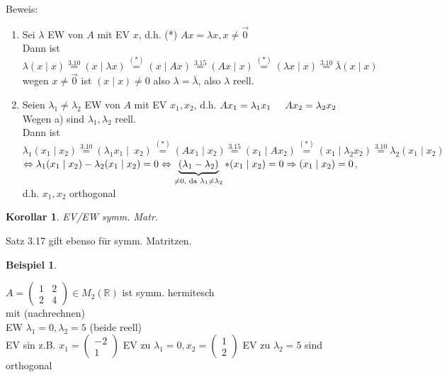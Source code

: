 \documentclass[a4paper,11pt]{article}
\newtheorem{bsp}[definition]{Beispiel}
\newtheorem{koro}[definition]{Korollar}
\newcommand{\zerovec}{\overset{\rightarrow}{0}}
\newcommand{\hsp}{\hspace{5mm}}
\begin{document}
Beweis:
\begin{enumerate}[label=\alph*)]
	\item Sei $\lambda$ EW von $A$ mit EV $x$, d.h. \hsp (*) $Ax=\lambda x, x\neq\zerovec$ \\
	Dann ist $\lambda(x\mid x)\overset{3.10}{=}(x\mid\lambda x)\overset{(*)}{=}(x\mid Ax)\overset{3.15}{=}(Ax\mid x)\overset{(*)}{=}(\lambda x\mid x)\overset{3.10}{=}\bar\lambda(x\mid x)$ \\
	wegen $x\neq\zerovec$ ist $(x\mid x)\neq0$ also $\lambda=\bar\lambda$, also $\lambda$ reell.
	\item Seien $\lambda_1\neq\lambda_2$ EW von $A$ mit EV $x_1,x_2$, d.h. $Ax_1=\lambda_1 x_1\hsp Ax_2=\lambda_2 x_2$ \\
	Wegen a) sind $\lambda_1,\lambda_2$ reell. \\
	Dann ist $\lambda_1(x_1\mid x_2)\overset{3.10}{=}(\lambda_1x_1\mid\ x_2)\overset{(*)}{=}(Ax_1\mid x_2)\overset{3.15}{=}(x_1\mid Ax_2)\overset{(*)}{=}(x_1\mid\lambda_2x_2)\overset{3.10}{=}\lambda_2(x_1\mid x_2)$ \\
	$\Leftrightarrow\lambda_1(x_1\mid x_2)-\lambda_2(x_1\mid x_2)=0 \\
	\Leftrightarrow\underbrace{(\lambda_1-\lambda_2)}_{\neq0\text{, da }\lambda_1\neq\lambda_2}*(x_1\mid x_2)=0 \\
	\Rightarrow(x_1\mid x_2)=0$, d.h. $x_1,x_2$ orthogonal
\end{enumerate}

\begin{koro}
	EV/EW symm. Matr.
\end{koro}
Satz 3.17 gilt ebenso für symm. Matritzen.

\begin{bsp}
\end{bsp}
$A=\begin{pmatrix}1&2\\2&4\end{pmatrix}\in M_2(\mathbb{R})$ ist symm. hermitesch \\
mit (nachrechnen) \\
EW $\lambda_1=0,\lambda_2=5$ (beide reell) \\
EV sin z.B. $x_1=\begin{pmatrix}-2\\1\end{pmatrix}$ EV zu $\lambda_1=0,x_2=\begin{pmatrix}1\\2\end{pmatrix}$ EV zu $\lambda_2=5$ sind orthogonal
\end{document}
